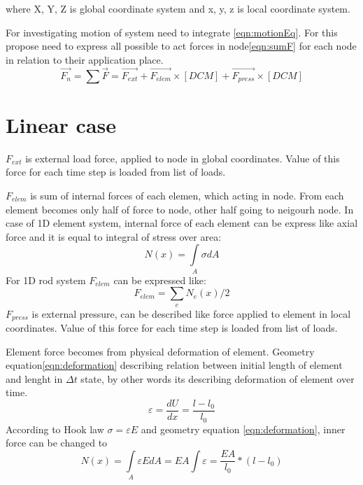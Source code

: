 \documentclass[12pt]{report}
\begin{document}
 where {X, Y, Z} is global coordinate system and {x, y, z} is local coordinate system.\par
For investigating motion of system need to integrate \eqref{eqn:motionEq}. For this propose need to express all possible 
to act forces in node\eqref{eqn:sumF} for each node in relation to their application place. 
\begin{equation}\label{eqn:sumF}
   \overrightarrow{F_n}=\sum\overrightarrow{F}=
   \overrightarrow{F_{ext}}+
   \overrightarrow{F_{elem}}\times[DCM]+
   \overrightarrow{F_{press}}\times[DCM]
\end{equation}\par
\section{Linear case}
$F_{ext}$ is external load force, applied to node in global coordinates. Value of this force for each time step is loaded
from list of loads.\par
$F_{elem}$ is sum of internal forces of each elemen, which acting in node. From each element becomes only half of force to 
node, other half going to neigourh node. In case of 1D element system, internal force of each element can be express like
axial force and it is equal to integral of stress over area:
\begin{equation}\label{eqn:Nx}
  N(x)= \int\limits_A \sigma dA
\end{equation}
For 1D rod system $F_{elem}$ can be expressed like:
\begin{equation}\label{eqn:Felem}
  F_{elem}= \sum_{e}N_e(x)/2
\end{equation}
$F_{press}$ is external pressure, can be described like force applied to element in local coordinates. Value of this force
for each time step is loaded from list of loads. \par
Element force becomes from physical deformation of element. Geometry equation\eqref{eqn:deformation} describing relation between initial length of
element and lenght in $\Delta t$ state, by other words its describing deformation of element over time.
\begin{equation}\label{eqn:deformation}
  \varepsilon=\frac{dU}{dx}=\frac{l-l_0}{l_0}
\end{equation}
According to Hook law $\sigma=\varepsilon E$ and geometry equation \eqref{eqn:deformation}, inner force can be changed to
\begin{equation}\label{eqn:NxFull}
  N(x)= \int\limits_A \varepsilon EdA=EA\int \varepsilon=\frac{EA}{l_0}*(l-l_0)
\end{equation}
\end{document}
